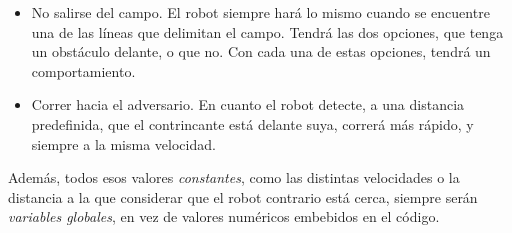 \begin{description}
	\begin{itemize}
		\item No salirse del campo. El robot siempre hará lo mismo cuando se encuentre una de las líneas que delimitan el campo. Tendrá las dos opciones, que tenga un obstáculo delante, o que no. Con cada una de estas opciones, tendrá un comportamiento.
		\item Correr hacia el adversario. En cuanto el robot detecte, a una distancia predefinida, que el contrincante está delante suya, correrá más rápido, y siempre a la misma velocidad. 		
	\end{itemize} 
	Además, todos esos valores \textit{constantes}, como las distintas velocidades o la distancia a la que considerar que el robot contrario está cerca, siempre serán \textit{variables globales}, en vez de valores numéricos embebidos en el código.
	

\end{description}

